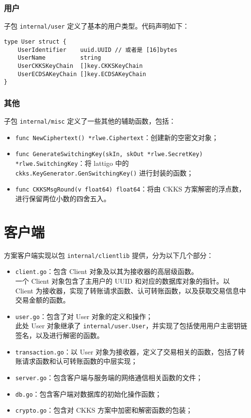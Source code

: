 \subsubsection{用户}

子包 \verb|internal/user| 定义了基本的用户类型。代码声明如下：

\begin{verbatim}
type User struct {
    UserIdentifier    uuid.UUID // 或者是 [16]bytes
    UserName          string
    UserCKKSKeyChain  []key.CKKSKeyChain
    UserECDSAKeyChain []key.ECDSAKeyChain
}
\end{verbatim}

\subsubsection{其他}

子包 \verb|internal/misc| 定义了一些其他的辅助函数，包括：

\begin{itemize}
    \item \verb|func NewCiphertext() *rlwe.Ciphertext|：创建新的空密文对象；
    \item \verb|func GenerateSwitchingKey(skIn, skOut *rlwe.SecretKey) *rlwe.SwitchingKey|：将 lattigo 中的 \verb|ckks.KeyGenerator.GenSwitchingKey()| 进行封装的函数；
    \item \verb|func CKKSMsgRound(v float64) float64|：将由 CKKS 方案解密的浮点数，进行保留两位小数的四舍五入。
\end{itemize}

\section{客户端}

方案客户端实现以包 \verb|internal/clientlib| 提供，分为以下几个部分：

\begin{itemize}
    \item \verb|client.go|：包含 Client 对象及以其为接收器的高层级函数。\\
    一个 Client 对象包含了主用户的 UUID 和对应的数据库对象的指针。以 Client 为接收器，实现了转账请求函数、认可转账函数，以及获取交易信息中交易金额的函数。
    \item \verb|user.go|：包含了对 User 对象的定义和操作；\\
    此处 User 对象继承了 \verb|internal/user.User|，并实现了包括使用用户主密钥链签名，以及进行解密的函数。
    \item \verb|transaction.go|：以 User 对象为接收器，定义了交易相关的函数，包括了转账请求函数和认可转账函数的中层实现；
    \item \verb|server.go|：包含客户端与服务端的网络通信相关函数的文件；
    \item \verb|db.go|：包含客户端对数据库的初始化操作函数；
    \item \verb|crypto.go|：包含对 CKKS 方案中加密和解密函数的包装；
\end{itemize}

